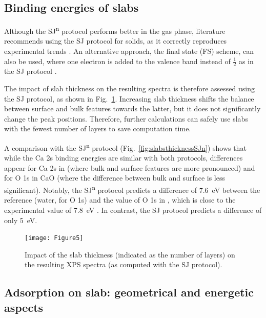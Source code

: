 \documentclass[12pt,a4paper]{article}
\begin{document}
\clearpage
\subsection{Binding energies of slabs}

Although the SJ\textsuperscript{n} protocol performs better in the gas phase, literature recommends using the SJ protocol for solids, as it correctly reproduces experimental trends \cite{olovssonCorelevelShiftsComplex2006}. An alternative approach, the final state (FS) scheme, can also be used, where one electron is added to the valence band instead of $\frac{1}{2}$ as in the SJ protocol \cite{trinhEvaluatingStructureCatalysts2013a,vandenbosscheEffectsNonlocalExchange2014}.

The impact of slab thickness on the resulting spectra is therefore assessed using the SJ protocol, as shown in Fig.~\ref{fig:slabsthickness}. Increasing slab thickness shifts the balance between surface and bulk features towards the latter, but it does not significantly change the peak positions. Therefore, further calculations can safely use slabs with the fewest number of layers to save computation time.

A comparison with the SJ\textsuperscript{n} protocol (Fig.~\ref{fig:slabsthicknessSJn}) shows that while the Ca 2s binding energies are similar with both protocols, differences appear for Ca 2s in  (where bulk and surface features are more pronounced) and for O 1s in CaO (where the difference between bulk and surface is less significant). Notably, the SJ\textsuperscript{n} protocol predicts a difference of \SI{7.6}{\electronvolt} between the reference (water, for O 1s) and the value of O 1s in , which is close to the experimental value of \SI{7.8}{\electronvolt} \cite{cristHandbookMonochromaticXPS1999}. In contrast, the SJ protocol predicts a difference of only \SI{5}{\electronvolt}.



\begin{figure}[!h]
	\centering
	\texttt{[image: Figure5]}
	\caption{Impact of the slab thickness (indicated as the number of layers) on the resulting XPS spectra (as computed with the SJ protocol).}
	\label{fig:slabsthickness}
\end{figure}


\subsection{Adsorption on slab: geometrical and energetic aspects}
\end{document}
